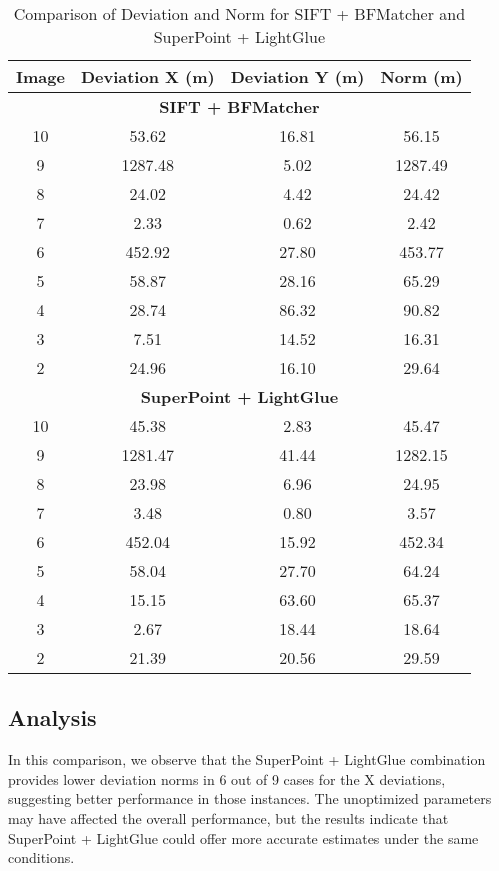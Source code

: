 \begin{table}[H]
    \centering
    \begin{tabular}{|c|c|c|c|}
        \hline
        \textbf{Image} & \textbf{Deviation X (m)} & \textbf{Deviation Y (m)} & \textbf{Norm (m)} \\
        \hline
        \multicolumn{4}{|c|}{\textbf{SIFT + BFMatcher}} \\
        \hline
        10 & 53.62 & 16.81 & 56.15 \\
        9 & 1287.48 & 5.02 & 1287.49 \\
        8 & 24.02 & 4.42 & 24.42 \\
        7 & 2.33 & 0.62 & 2.42 \\
        6 & 452.92 & 27.80 & 453.77 \\
        5 & 58.87 & 28.16 & 65.29 \\
        4 & 28.74 & 86.32 & 90.82 \\
        3 & 7.51 & 14.52 & 16.31 \\
        2 & 24.96 & 16.10 & 29.64 \\
        \hline
        \multicolumn{4}{|c|}{\textbf{SuperPoint + LightGlue}} \\
        \hline
        10 & 45.38 & 2.83 & 45.47 \\
        9 & 1281.47 & 41.44 & 1282.15 \\
        8 & 23.98 & 6.96 & 24.95 \\
        7 & 3.48 & 0.80 & 3.57 \\
        6 & 452.04 & 15.92 & 452.34 \\
        5 & 58.04 & 27.70 & 64.24 \\
        4 & 15.15 & 63.60 & 65.37 \\
        3 & 2.67 & 18.44 & 18.64 \\
        2 & 21.39 & 20.56 & 29.59 \\
        \hline
    \end{tabular}
    \caption{Comparison of Deviation and Norm for SIFT + BFMatcher and SuperPoint + LightGlue}
    \label{tab:comparison}
\end{table}

\subsection*{Analysis}
In this comparison, we observe that the SuperPoint + LightGlue combination provides lower deviation norms in 6 out of 9 cases for the X deviations, suggesting better performance in those instances. The unoptimized parameters may have affected the overall performance, but the results indicate that SuperPoint + LightGlue could offer more accurate estimates under the same conditions.






